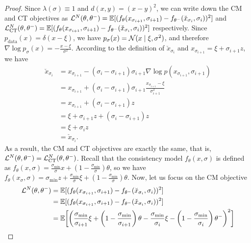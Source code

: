 \begin{proof}
Since $\lambda(\sigma) \equiv 1$ and $d(x, y) = (x-y)^2$, we can write down the CM and CT objectives as
$\mathcal{L}^{N}(\theta, \theta^{-}) = \mathbb{E}[(f_\theta(x_{\sigma_{i+1}}, \sigma_{i+1}) - f_{\theta^-}(\breve{x}_{\sigma_i}, \sigma_i))^2]$ and $\mathcal{L}^{N}_\text{CT}(\theta, \theta^{-}) = \mathbb{E}[(f_\theta(x_{\sigma_{i+1}}, \sigma_{i+1}) - f_{\theta^-}(\check{x}_{\sigma_i}, \sigma_i))^2]$ respectively. Since $p_\text{data}(x) = \delta(x - \xi)$, we have $p_\sigma(x) = \mathcal{N}(x\mid \xi, \sigma^2)$, and therefore $\nabla \log p_\sigma(x) = -\frac{x - \xi}{\sigma^2}$. According to the definition of $\breve{x}_{\sigma_i}$ and $x_{\sigma_{i+1}} = \xi + \sigma_{i+1}z$, we have
\begin{align*}
    \breve{x}_{\sigma_i} &= x_{\sigma_{i+1}} - (\sigma_i - \sigma_{i+1})\sigma_{i+1}\nabla \log p(x_{\sigma_{i+1}}, \sigma_{i+1})\\
    &=x_{\sigma_{i+1}} + (\sigma_i - \sigma_{i+1})\sigma_{i+1}\frac{x_{\sigma_{i+1}} - \xi}{\sigma_{i+1}^2}\\
    &=x_{\sigma_{i+1}} + (\sigma_i - \sigma_{i+1})z\\
    &=\xi + \sigma_{i+1}z + (\sigma_i - \sigma_{i+1})z\\
    &=\xi + \sigma_iz\\
    &=\check{x}_{\sigma_i}.
\end{align*}
As a result, the CM and CT objectives are exactly the same, that is, $\mathcal{L}^N(\theta, \theta^-) = \mathcal{L}^N_\text{CT}(\theta, \theta^-)$. Recall that the consistency model $f_\theta(x, \sigma)$ is defined as $f_\theta(x, \sigma) = \frac{\sigma_\text{min}}{\sigma} x + \left(1 - \frac{\sigma_\text{min}}{\sigma} \right)\theta$, so we have $f_\theta(x_{\sigma}, \sigma) = \sigma_\text{min} z + \frac{\sigma_\text{min}}{\sigma}\xi + \left(1 - \frac{\sigma_\text{min}}{\sigma}\right)\theta$.
Now, let us focus on the CM objective
\begin{align*}
    \mcal{L}^N(\theta, \theta^-) &= \mbb{E}[(f_\theta(x_{\sigma_{i+1}}, \sigma_{i+1}) - f_{\theta^-}(\breve{x}_{\sigma_i}, \sigma_i))^2]\\
    &=\mbb{E}[(f_\theta(x_{\sigma_{i+1}}, \sigma_{i+1}) - f_{\theta^-}(\check{x}_{\sigma_i}, \sigma_i))^2]\\
    &=\mbb{E}\bigg[\bigg(\frac{\sigma_\text{min}}{\sigma_{i+1}}\xi + \left(1 - \frac{\sigma_\text{min}}{\sigma_{i+1}}\right)\theta - \frac{\sigma_\text{min}}{\sigma_i}\xi - \left(1 - \frac{\sigma_\text{min}}{\sigma_i}\right)\theta^-\bigg)^2\bigg]\\

\end{align*}
\end{proof}
